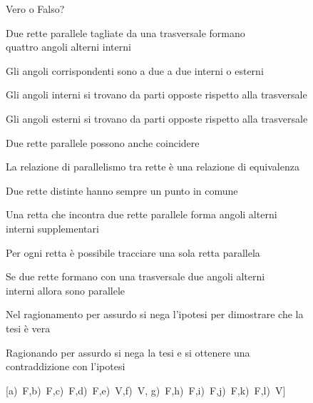 \begin{esercizio}
\label{ese:3.15}
Vero o Falso?
\begin{enumeratea}
\item Due rette parallele tagliate da una trasversale formano \\ 
quattro angoli alterni interni\hfill\boxV\quad\boxF
\item Gli angoli corrispondenti sono a due a due interni o 
esterni\hfill\boxV\quad\boxF
\item Gli angoli interni si trovano da parti opposte rispetto alla 
trasversale\hfill\boxV\quad\boxF
\item Gli angoli esterni si trovano da parti opposte rispetto alla 
trasversale\hfill\boxV\quad\boxF
\item Due rette parallele possono anche 
coincidere\hfill\boxV\quad\boxF
\item La relazione di parallelismo tra rette è una relazione di 
equivalenza\hfill\boxV\quad\boxF
\item Due rette distinte hanno sempre un punto in 
comune\hfill\boxV\quad\boxF
\item Una retta che incontra due rette parallele forma angoli alterni \\
interni supplementari\hfill\boxV\quad\boxF
\item Per ogni retta è possibile tracciare una sola retta 
parallela\hfill\boxV\quad\boxF
\item Se due rette formano con una trasversale due angoli alterni \\
interni allora sono parallele\hfill\boxV\quad\boxF
\item Nel ragionamento per assurdo si nega l'ipotesi per dimostrare che la \\
tesi è vera\hfill\boxV\quad\boxF
\item Ragionando per assurdo si nega la tesi e si ottenere una \\
contraddizione con l'ipotesi\hfill\boxV\quad\boxF
\end{enumeratea}
\hfill [a)~F,\quad b)~F,\quad c)~F,\quad d)~F,\quad e)~V,\quad f)~V,\quad 
g)~F,\quad h)~F,\quad i)~F,\quad j)~F,\quad k)~F,\quad l)~V]
\end{esercizio}

\begin{comment} 

\begin{esercizio}
\label{ese:}
~

\noindent\begin{minipage}{.45\textwidth}

\end{minipage} 
\begin{minipage}{.55\textwidth}
\begin{inaccessibleblock}[Figura: TODO]
\begin{center}  \end{center}
\end{inaccessibleblock}
\end{minipage}
\end{esercizio}

\end{comment}

